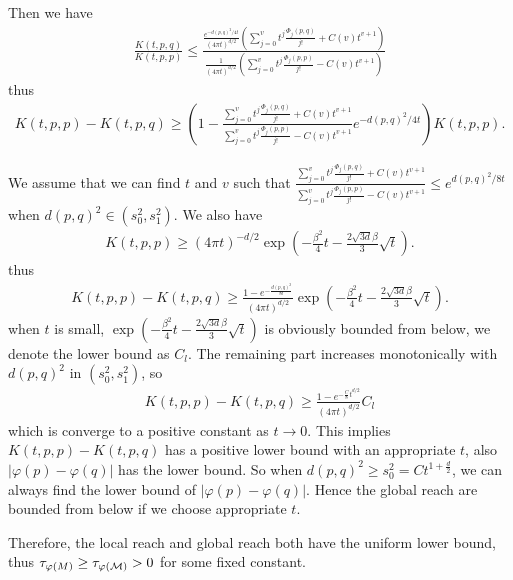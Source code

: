 Then we have
\begin{align}
	\frac{K(t,p,q)}{K(t,p,p)} \leq \frac{\frac{e^{-d(p,q)^2/4t}}{(4\pi t)^{d/2}} (\sum_{j=0}^{v} t^j \frac{\Phi_j(p,q)}{j !} + C(v) t^{v+1})}{\frac{1}{(4\pi t)^{d/2}} (\sum_{j=0}^{v} t^j \frac{\Phi_j(p,p)}{j !} - C(v) t^{v+1})}
\end{align}
thus
\begin{align}
	K(t,p,p) - K(t,p,q) \geq \left(1- \frac{ \sum_{j=0}^{v} t^j \frac{\Phi_j(p,q)}{j !} + C(v) t^{v+1}}{\sum_{j=0}^{v} t^j \frac{\Phi_j(p,p)}{j !} - C(v) t^{v+1}}e^{-d(p,q)^2/4t}\right) K(t,p,p).
\end{align}

We assume that we can find $t$ and $v$ such that $\frac{ \sum_{j=0}^{v} t^j \frac{\Phi_j(p,q)}{j !} + C(v) t^{v+1}}{\sum_{j=0}^{v} t^j \frac{\Phi_j(p,p)}{j !} - C(v) t^{v+1}} \leq e^{d(p,q)^2/8t}$ when $d(p,q)^2 \in (s_0^2,s_1^2)$. We also have
\begin{align}
	K(t,p,p) \geq (4\pi t)^{-d/2} \exp\left(-\frac{\beta^2}{4}t-\frac{2\sqrt{3d}\beta}{3}\sqrt{t}\right).
\end{align}
thus 
\begin{align}
	K(t,p,p) - K(t,p,q) \geq \frac{1 - e^{-\frac{d(p,q)^2}{8t}}}{(4\pi t)^{d/2}} \exp\left(-\frac{\beta^2}{4}t-\frac{2\sqrt{3d}\beta}{3}\sqrt{t}\right).
\end{align}
when $t$ is small, $\exp\left(-\frac{\beta^2}{4}t-\frac{2\sqrt{3d}\beta}{3}\sqrt{t}\right)$ is obviously bounded from below, we denote the lower bound as $C_l$. The remaining part increases monotonically with $d(p,q)^2$ in $(s_0^2, s_1^2)$, so 
\begin{align}
	K(t,p,p)- K(t,p,q) \geq \frac{1 - e^{-\frac{C}{8} t^{d/2}}}{(4\pi t)^{d/2}} C_l
\end{align}
which is converge to a positive constant as $t \to 0$. This implies $K(t,p,p) - K(t,p,q)$ has a positive lower bound with an appropriate $t$, also $|\varphi(p) - \varphi(q)|$ has the lower bound. So when $d(p,q)^2 \geq s_0^2 = Ct^{1+\frac{d}{2}} $, we can always find the lower bound of $|\varphi(p)- \varphi(q)|$. Hence the global reach are bounded from below if we choose appropriate $t$.

Therefore, the local reach and global reach both have the uniform lower bound, thus $\tau_{\varphi(M)}\geq \tau_{\varphi(\mathcal{M})}>0$ for some fixed constant.
